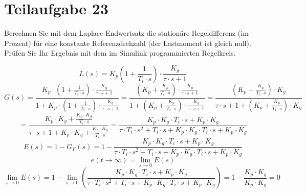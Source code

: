 \section{Teilaufgabe 23}
\begin{aufgabe}
Berechnen Sie mit dem Laplace Endwertsatz die stationäre Regeldifferenz (im 
Prozent) für eine konstante Referenzdrehzahl (der Lastmoment ist gleich null). 
Prüfen Sie Ihr Ergebnis mit dem im Simulink programmierten Regelkreis.
\end{aufgabe}
\[ L(s) = K_p \left(1 + \frac{1}{T_i \cdot s}\right) 
    \cdot \frac{K_g}{\tau \cdot s + 1} \]
\[ G(s) = \frac{K_p \cdot \left(1 + \frac{1}{T_i \cdot s}\right) 
        \cdot \frac{K_g}{\tau \cdot s + 1}}
        {1 + K_p \cdot \left(1 + \frac{1}{T_i \cdot s}\right) 
        \cdot \frac{K_g} {\tau \cdot s + 1}}
    = \frac{\left(K_p + \frac{K_p}{T_i \cdot s}\right) 
        \cdot \frac{K_g}{\tau \cdot s + 1}}
        {1 + \left(K_p + \frac{K_p}{T_i \cdot s}\right) 
        \cdot \frac{K_g} {\tau \cdot s + 1}}
    = \frac{\left(K_p + \frac{K_p}{T_i \cdot s}\right) 
        \cdot K_g}
        {\tau \cdot s + 1 + \left(K_p + \frac{K_p}{T_i \cdot s}\right) 
        \cdot K_g}
\]
\[  = \frac{K_p \cdot K_g + \frac{K_p \cdot K_g}{T_i \cdot s}}
        {\tau \cdot s + 1 + K_p \cdot K_g + \frac{K_p \cdot K_g}{T_i \cdot s}}
    = \frac{K_p \cdot K_g \cdot T_i \cdot s + K_p \cdot K_g}
        {\tau \cdot T_i \cdot s^2 + T_i \cdot s 
        + K_p \cdot K_g \cdot T_i \cdot s + K_p \cdot K_g}
\]
\[ E(s) = 1 - G_F(s) = 1 - \frac{K_p \cdot K_g \cdot T_i \cdot s + K_p \cdot K_g}
        {\tau \cdot T_i \cdot s^2 + T_i \cdot s
        + K_p \cdot K_g \cdot T_i \cdot s + K_p \cdot K_g}
\]
\[ e(t \to \infty) = \lim\limits_{s \to 0} E(s) \]
\[ \lim\limits_{s \to 0} E(s) = 1 - \lim\limits_{s \to 0} 
        \left(\frac{K_p \cdot K_g \cdot T_i \cdot s + K_p \cdot K_g}
        {\tau \cdot T_i \cdot s^2 + T_i \cdot s 
        + K_p \cdot K_g \cdot T_i \cdot s + K_p \cdot K_g}\right)
    = 1 - \frac{K_p \cdot K_g}{K_p \cdot K_g}
    = 0
\]
